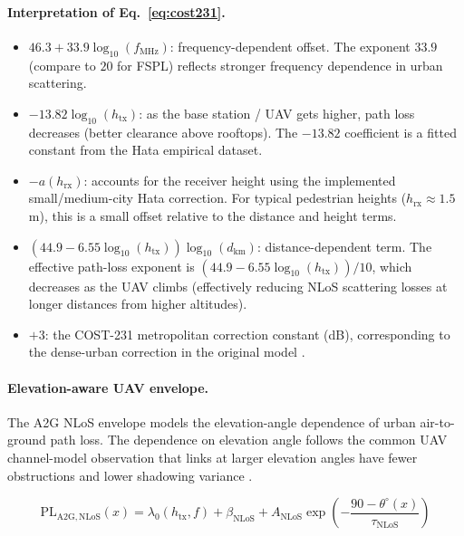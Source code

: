\paragraph{Interpretation of Eq.~\eqref{eq:cost231}.}
\begin{itemize}
\item $46.3 + 33.9\log_{10}(f_{\mathrm{MHz}})$: frequency-dependent offset.
      The exponent $33.9$ (compare to $20$ for FSPL) reflects stronger
      frequency dependence in urban scattering.
\item $-13.82\log_{10}(h_{\mathrm{tx}})$: as the base station / UAV gets
      higher, path loss decreases (better clearance above rooftops). The
      $-13.82$ coefficient is a fitted constant from the Hata empirical
      dataset.
\item $-a(h_{\mathrm{rx}})$: accounts for the receiver height using the
      implemented small/medium-city Hata correction. For typical pedestrian
      heights ($h_{\mathrm{rx}} \approx 1.5$ m), this is a small offset
      relative to the distance and height terms.
\item $(44.9 - 6.55\log_{10}(h_{\mathrm{tx}}))\log_{10}(d_{\mathrm{km}})$:
      distance-dependent term. The effective path-loss exponent is
      $(44.9 - 6.55\log_{10}(h_{\mathrm{tx}}))/10$, which decreases as the
      UAV climbs (effectively reducing NLoS scattering losses at longer
      distances from higher altitudes).
\item $+3$: the COST-231 metropolitan correction constant (dB), corresponding
      to the dense-urban correction in the original model \cite{cost231}.
\end{itemize}

\paragraph{Elevation-aware UAV envelope.}
The A2G NLoS envelope models the elevation-angle dependence of urban
air-to-ground path loss. The dependence on elevation angle follows the common
UAV channel-model observation that links at larger elevation angles have fewer
obstructions and lower shadowing variance \cite{khawaja_survey,tr38901}.

\begin{equation}
\mathrm{PL}_{\mathrm{A2G,NLoS}}(x)
=
\lambda_0(h_{\mathrm{tx}}, f)
+ \beta_{\mathrm{NLoS}}
+ A_{\mathrm{NLoS}}
\exp\!\left(-\frac{90-\theta^\circ(x)}{\tau_{\mathrm{NLoS}}}\right)
\label{eq:a2g_nlos}
\end{equation}

